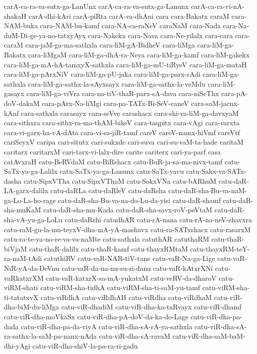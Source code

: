 {carA-ca-ra-va-sutx-ga-LanUnx
carA-ca-ra-va-sutx-ga-Lanunx
carA-ca-ra-vi-nA-shakaH
carA-dhi-kAri
carA-piRta
carA-va-dhAni
cara
cara-Bakatx
caraM
cara-NAM-buka
cara-NAM-bu-kamf
cara-NA-ca-raNeV
caraNaM
cara-Nada
cara-Na-duM-Di-ge-ya-no-tatxyAyx
cara-Nakekx
cara-Nava
cara-Ne-yilalx
cara-cara
cara-caraM
cara-jaM-ga-ma-sathxla
cara-liM-gA-BidheV
cara-liMga
cara-liM-ga-Bakatx
cara-liMgaM
cara-liM-ga-dhA-ra-Neya
cara-liM-ga-kamf
cara-liM-gakekx
cara-liM-ga-mA-hA-tamxyX-sathxla
cara-liM-ga-mU-tiRyeV
cara-liM-ga-mataH
cara-liM-ga-pArxNiV
cara-liM-ga-pU-jaka
cara-liM-ga-parx-sAdi
cara-liM-ga-sathxla
cara-liM-ga-sathx-la-sAyxsayx
cara-liM-ga-sathx-la-veMdu
cara-liM-gasayx
cara-liM-ga-viVra
cara-na-tiV-thaR-parx-sA-dava
cara-niSeThx
cara-pA-doV-dakaM
cara-pArx-Na-liMgi
cara-pa-TATx-Bi-SeV-caneV
cara-saM-jacnx-kAnf
cara-sathxla
carasayx
cara-seVve
carashacx
cara-shi-va-liM-ga-davxyaM
cara-sithxra
cara-sithx-ra-ma-thAM-bikeV
cara-taqpitx
cara-vAgi
cara-varxta
cara-vi-garx-ha-vA-dAta
cara-vi-sa-jiR-tamf
careV
careV-namx-hiVmf
careVtf
cariSeyxV
caripa
cari-situtx
cari-sukxde
cari-suva
cari-su-vaM-ta-hade
caritaM
caritarx
caritarxM
cari-tarx-vi-lalx-dire
carite
cariterx
cari-ya-parf
casa
catAvxraH
catu-BeRVdaM
catu-BiRshacx
catu-BuR-ja-sa-ma-nivx-tamf
catu-SaTx-ya-ga-Lalilx
catu-SaTx-ya-ga-Lanunx
catu-SaTx-yavu
catu-Sakx-va-SATx-dasha
catu-SipxVTha
catu-SipxVThaM
catu-SokxVNa
catu-bARhuM
catu-daR-LA-garx-dalilx
catu-daRLa
catu-daRleV
catu-daRsha
catu-daR-sha-Bu-va-naM-ga-Lo-La-ho-rage
catu-daR-sha-Bu-va-na-do-Lu-da-yisi
catu-daR-shamf
catu-daR-sha-muKaM
catu-daR-sha-mu-Kada
catu-daR-sha-savx-roV-peVtaM
catu-daR-sha-vA-yu-ga-LoLu
catu-daRshi
catudhAR
catu-rA-nana
catu-rA-na-neV-shavxra
catu-raM-gu-la-mu-teyxV-dha-mA-yA-mashavx
catu-ra-SATxshacx
catu-rasarxM
catu-ra-te-ya-no-re-va-va-naMte
catu-sathxla
catuthAR
catuthaRM
catu-thaR-biVjaM
catu-thaR-dalilx
catu-thaR-kamf
catu-thayxRMtaM
catu-thayxRM-teY-ra-naM-tAdi
catuthiRV
catu-vaR-NAR-tiV-tane
catu-vaR-Na-ga-Lige
catu-vaR-NiR-yA-da-DeVnu
catu-vaR-da-na-nu-su-ri-danu
catu-vaR-kAtxrXNi
catu-vaRkatxrXM
catu-vaR-katxrX-sa-mA-yukatxM
catu-veRV-da-dharoV
catu-viRM-shati
catu-viRM-sha-tidhA
catu-viRM-sha-ti-saM-yu-tamf
catu-viRM-sha-ti-tatatxvX
catu-viRdhA
catu-viRdhAH
catu-viRdha
catu-viRdhaM
catu-viR-dha-biM-du-liMga
catu-viR-dhadiM
catu-viR-dha-ka-taRvayx
catu-viR-dhamf
catu-viR-dha-moVkaSx
catu-viR-dha-pA-doV-da-ka-do-Lage
catu-viR-dha-pa-dada
catu-viR-dha-pa-da-viyA
catu-viR-dha-sA-rA-ya-sathxla
catu-viR-dha-sA-ra-sathx-la-saM-pa-nanx-nAda
catu-viR-dha-sA-ravaM
catu-viR-dha-saM-baM-dhi-yAgi
catu-viR-dha-shiV-la-pa-ra-ri-gadu
}
